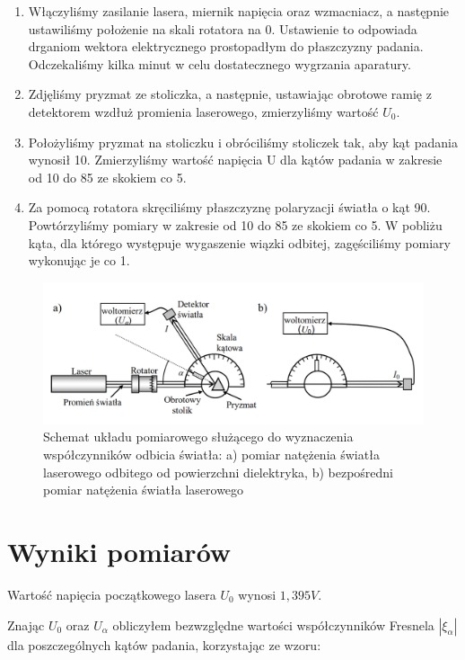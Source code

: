 \documentclass[polish, a4paper]{article}
\begin{document}
\begin{enumerate}
\item{Włączyliśmy zasilanie lasera, miernik napięcia oraz wzmacniacz, a następnie ustawiliśmy położenie na skali rotatora na 0. Ustawienie to odpowiada drganiom wektora elektrycznego prostopadłym do płaszczyzny padania. Odczekaliśmy kilka
minut w celu dostatecznego wygrzania aparatury.}
\item{Zdjęliśmy pryzmat ze stoliczka, a następnie, ustawiając obrotowe ramię z detektorem wzdłuż promienia laserowego, zmierzyliśmy wartość $U_0$.}
\item{Położyliśmy pryzmat na stoliczku i obróciliśmy stoliczek tak, aby kąt padania wynosił 10\degree. Zmierzyliśmy wartość napięcia U dla kątów padania w zakresie od 10\degree \; do 85\degree \; ze skokiem co 5\degree.}
\item{Za pomocą rotatora skręciliśmy płaszczyznę polaryzacji światła o kąt 90\degree. Powtórzyliśmy pomiary w zakresie od 10\degree \; do 85\textdegree \; ze skokiem co 5\degree. W pobliżu kąta, dla którego występuje wygaszenie wiązki odbitej, zagęściliśmy pomiary wykonując je co 1\degree.}
\end{enumerate}

\begin{figure}[H]
\centering
\includegraphics[width=\textwidth]{woltomierz.png}
\caption{Schemat układu pomiarowego służącego do wyznaczenia współczynników odbicia
światła: a) pomiar natężenia światła laserowego odbitego od powierzchni dielektryka, b)
bezpośredni pomiar natężenia światła laserowego}
\end{figure}

\section{Wyniki pomiarów}


Wartość napięcia początkowego lasera $U_0$ wynosi $1,395 V$.

Znając $U_0$ oraz $U_\alpha$ obliczyłem bezwzględne wartości współczynników Fresnela $| \xi_\alpha |$ dla poszczególnych kątów padania, korzystając ze wzoru:
\end{document}
